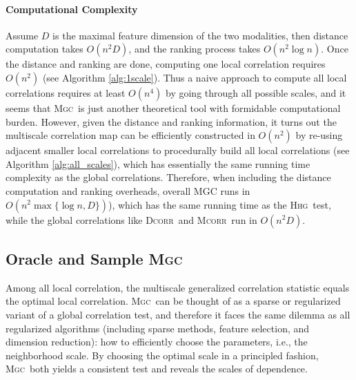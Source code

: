 \documentclass[11pt]{article}
\providecommand{\sct}[1]{{\normalfont\textsc{#1}}}
\newcommand{\Mgc}{\sct{Mgc}}
\newcommand{\Hhg}{\sct{Hhg}}
\newcommand{\Dcorr}{\sct{Dcorr}}
\newcommand{\Mcorr}{\sct{Mcorr}}
\begin{document}
\paragraph{Computational Complexity}



Assume $D$ is the maximal feature dimension of the two modalities, then distance computation takes $O(n^2 D)$, and the ranking process takes $O(n^2 \log n)$. Once the distance and ranking are done, computing one local correlation requires $O(n^2)$ (see Algorithm \ref{alg:1scale}). Thus a naive approach to compute all local correlations requires at least $O(n^4)$ by going through all possible scales, and it seems that \Mgc~is just another theoretical tool with formidable computational burden. However, given the distance and ranking information, it turns out the multiscale correlation map can be efficiently constructed in $O(n^2)$ by re-using adjacent smaller local correlations to procedurally build all local correlations (see Algorithm \ref{alg:all_scales}), which has essentially the same running time complexity as the global correlations. Therefore, when including the distance computation and ranking overheads, overall MGC runs in $O(n^2 \max\{\log n,D\})$), which has the same running time as the \Hhg~test, while the global correlations like \Dcorr~and \Mcorr~run in $O(n^2D)$.


\subsection{Oracle and Sample \Mgc}
\label{appen:mgc2}
Among all local correlation, the multiscale generalized correlation statistic equals the optimal local correlation. \Mgc~can be thought of as a sparse or regularized variant of a global correlation test, and therefore it faces the same dilemma as all regularized algorithms (including sparse methods, feature selection, and dimension reduction): how to efficiently choose the parameters, i.e., the neighborhood scale. By choosing the optimal scale in a principled fashion, \Mgc~both yields a consistent test and reveals the scales of dependence.  
\end{document}
